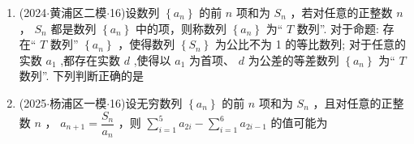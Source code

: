 \begin{enumerate}
\begin{jieda}
        对于  ，$a_n = 1$即可, 故    是真命题. 
    \end{jieda}
    \item (2024$\cdot$黄浦区二模$\cdot$16)设数列 $\left\{  {a}_{n}\right\}$ 的前 $n$ 项和为 ${S}_{n}$ ，若对任意的正整数 $n$ ， ${S}_{n}$ 都是数列 $\left\{  {a}_{n}\right\}$ 中的项，则称数列 $\left\{  {a}_{n}\right\}$ 为“ $T$ 数列”. 对于命题:   存在“ $T$ 数列” $\left\{  {a}_{n}\right\}$ ，使得数列 $\left\{  {S}_{n}\right\}$ 为公比不为 1 的等比数列;    对于任意的实数 ${a}_{1}$ ,都存在实数 $d$ ,使得以 ${a}_{1}$ 为首项、 $d$ 为公差的等差数列 $\left\{  {a}_{n}\right\}$ 为“ $T$ 数列”. 下列判断正确的是 
    \begin{jieda}
    \end{jieda}
    \item (2025$\cdot$杨浦区一模$\cdot$16)设无穷数列 $\left\{  {a}_{n}\right\}$ 的前 $n$ 项和为 ${S}_{n}$ ，且对任意的正整数 $n$ ， ${a}_{n + 1} = \dfrac{{S}_{n}}{{a}_{n}}$ ，则 $\mathop{\sum }\limits_{{i = 1}}^{5}{a}_{2i} - \mathop{\sum }\limits_{{i = 1}}^{6}{a}_{{2i} - 1}$ 的值可能为 
    \begin{jieda}

\end{jieda}
\end{enumerate}
